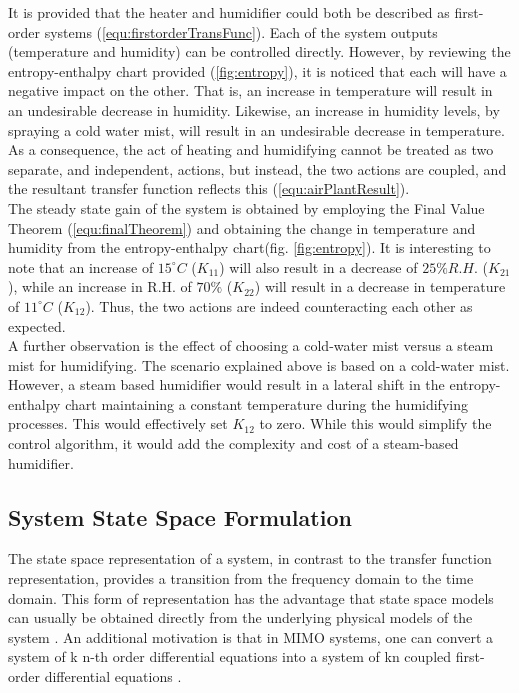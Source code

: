 \documentclass[a4paper, titlepage]{article}
\begin{document}
It is provided that the heater and humidifier could both be described as first-order systems (\ref{equ:firstorderTransFunc}).
Each of the system outputs (temperature and humidity) can be controlled directly.  
However, by reviewing the entropy-enthalpy chart provided (\ref{fig:entropy}), it is noticed that each will have a negative impact on the other.  
That is, an increase in temperature will result in an undesirable decrease in humidity.  
Likewise, an increase in humidity levels, by spraying a cold water mist, will result in an undesirable decrease in temperature.\\

As a consequence, the act of heating and humidifying cannot be treated as two separate, and independent, actions, but instead, the two actions are coupled, and the resultant transfer function reflects this (\ref{equ:airPlantResult}).\\

The steady state gain of the system is obtained by employing the Final Value Theorem (\ref{equ:finalTheorem}) and obtaining the change in temperature and humidity from the entropy-enthalpy chart(fig. \ref{fig:entropy}).  It is interesting to note that an increase of $15^\circ C$ ($K_{11}$) will also result in a decrease of $25\% R.H.$ ($K_{21}$), while an increase in R.H. of $70\%$ ($K_{22}$) will result in a decrease in temperature of $11^\circ C$ ($K_{12}$).  Thus, the two actions are indeed counteracting each other as expected.\\

A further observation is the effect of choosing a cold-water mist versus a steam mist for humidifying.  The scenario explained above is based on a cold-water mist.  However, a steam based humidifier would result in a lateral shift in the entropy-enthalpy chart maintaining a constant temperature during the humidifying processes.  This would effectively set $K_{12}$ to zero.  While this would simplify the control algorithm, it would add the complexity and cost of a steam-based humidifier.\\   

\subsection{System State Space Formulation}
   
The state space representation of a system, in contrast to the transfer function representation, provides a transition from the frequency domain to the time domain.  This form of representation has the advantage that state space models can usually be obtained directly from the underlying physical models of the system \citep[p.~32]{glad00}.  An additional motivation is that in MIMO systems, one can convert a system of k n-th order differential equations into a system of kn coupled first-order differential equations \citep[p.~5]{williams07}.\\
\end{document}
